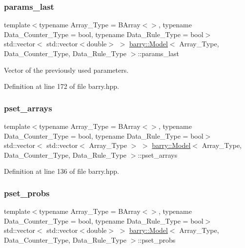 \subsubsection{\texorpdfstring{params\+\_\+last}{params\_last}}
{\footnotesize\ttfamily template$<$typename Array\+\_\+\+Type  = B\+Array$<$$>$, typename Data\+\_\+\+Counter\+\_\+\+Type  = bool, typename Data\+\_\+\+Rule\+\_\+\+Type  = bool$>$ \\
std\+::vector$<$ std\+::vector$<$double$>$ $>$ \hyperlink{classbarry_1_1_model}{barry\+::\+Model}$<$ Array\+\_\+\+Type, Data\+\_\+\+Counter\+\_\+\+Type, Data\+\_\+\+Rule\+\_\+\+Type $>$\+::params\+\_\+last}



Vector of the previously used parameters. 



Definition at line 172 of file barry.\+hpp.

\mbox{\label{classbarry_1_1_model_ae5aad2049cc19ee36e9c2cfefd65a0dd}} 
\subsubsection{\texorpdfstring{pset\+\_\+arrays}{pset\_arrays}}
{\footnotesize\ttfamily template$<$typename Array\+\_\+\+Type  = B\+Array$<$$>$, typename Data\+\_\+\+Counter\+\_\+\+Type  = bool, typename Data\+\_\+\+Rule\+\_\+\+Type  = bool$>$ \\
std\+::vector$<$ std\+::vector$<$ Array\+\_\+\+Type $>$ $>$ \hyperlink{classbarry_1_1_model}{barry\+::\+Model}$<$ Array\+\_\+\+Type, Data\+\_\+\+Counter\+\_\+\+Type, Data\+\_\+\+Rule\+\_\+\+Type $>$\+::pset\+\_\+arrays}



Definition at line 136 of file barry.\+hpp.

\mbox{\label{classbarry_1_1_model_a4ccabb6842238fa5c7ff3476ef760423}} 
\subsubsection{\texorpdfstring{pset\+\_\+probs}{pset\_probs}}
{\footnotesize\ttfamily template$<$typename Array\+\_\+\+Type  = B\+Array$<$$>$, typename Data\+\_\+\+Counter\+\_\+\+Type  = bool, typename Data\+\_\+\+Rule\+\_\+\+Type  = bool$>$ \\
std\+::vector$<$ std\+::vector$<$double$>$ $>$ \hyperlink{classbarry_1_1_model}{barry\+::\+Model}$<$ Array\+\_\+\+Type, Data\+\_\+\+Counter\+\_\+\+Type, Data\+\_\+\+Rule\+\_\+\+Type $>$\+::pset\+\_\+probs}



